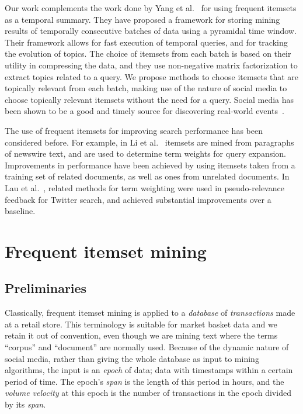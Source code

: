 \documentclass{sig-alternate}
\begin{document}

Our work complements the work done by Yang et al.~\cite{yang2012framework} for using frequent itemsets as a temporal summary. They have proposed a framework for storing mining results of temporally consecutive batches of data using a pyramidal time window. Their framework allows for fast execution of temporal queries, and for tracking the evolution of topics. 
The choice of itemsets from each batch is based on their utility in compressing the data, and they use non-negative matrix factorization to extract topics related to a query. We propose methods to choose itemsets that are topically relevant from each batch, making use of the nature of social media to choose topically relevant itemsets without the need for a query. Social media has been shown to be a good and timely source for discovering real-world events~\cite{ritter2012open,petrovic2010streaming}.

The use of frequent itemsets for improving search performance has been considered before. 
For example, in Li et al.~\cite{li2010mining} itemsets are mined from
paragraphs of newswire text, and are used to determine term weights for query
expansion.
Improvements in performance have been achieved by using itemsets taken from
a training set of related documents, as well as ones from unrelated documents.
In Lau et al.~\cite{laumicroblog}, related methods for term weighting were
used in pseudo-relevance feedback for Twitter search,
and achieved substantial improvements over a baseline.

\section{Frequent itemset mining}
\label{sec:fim}
\subsection{Preliminaries}
Classically, frequent itemset mining is applied to a \emph{database} of
\emph{transactions} made at a retail store.
This terminology is suitable for market basket data and we retain it out of
convention, even though we are mining text where the terms ``corpus'' and
``document'' are normally used.
Because of the dynamic nature of social media, rather than giving the whole
database as input to mining algorithms, the input is an \emph{epoch} of data;
data with timestamps within a certain period of time.
The epoch's \emph{span} is the length of this period in hours,
and the \emph{volume velocity} at this epoch is the number of transactions in the epoch
divided by its \emph{span}.
\end{document}
